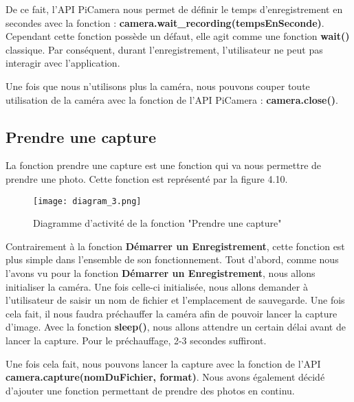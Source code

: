             De ce fait, l'API PiCamera nous permet de définir le temps d'enregistrement en secondes avec la fonction : \textbf{camera.wait\_recording(tempsEnSeconde)}. Cependant cette fonction possède un défaut, elle agit comme une fonction \textbf{wait()} classique. Par conséquent, durant l'enregistrement, l'utilisateur ne peut pas interagir avec l'application. 
            
            \vspace{0.4cm}

            Une fois que nous n'utilisons plus la caméra, nous pouvons couper toute utilisation de la caméra avec la fonction de l'API PiCamera : \textbf{camera.close()}.
            
        \subsection{Prendre une capture}
        La fonction prendre une capture est une fonction qui va nous permettre de prendre une photo.
        Cette fonction est représenté par la figure 4.10.
        \begin{figure}[ht]
            \centering
            \texttt{[image: diagram\_3.png]} 
            \caption{Diagramme d'activité de la fonction "Prendre une capture"}
        \end{figure}

        Contrairement à la fonction \textbf{Démarrer un Enregistrement}, cette fonction est plus simple dans l'ensemble de son fonctionnement. Tout d'abord, comme nous l'avons vu pour la fonction \textbf{Démarrer un Enregistrement}, nous allons initialiser la caméra. Une fois celle-ci initialisée, nous allons demander à l'utilisateur de saisir un nom de fichier et l'emplacement de sauvegarde. Une fois cela fait, il nous faudra préchauffer la caméra afin de pouvoir lancer la capture d'image. Avec la fonction \textbf{sleep()}, nous allons attendre un certain délai avant de lancer la capture.
        Pour le préchauffage, 2-3 secondes suffiront.

        \vspace{0.2cm}

        Une fois cela fait, nous pouvons lancer la capture avec la fonction de l'API \textbf{camera.capture(nomDuFichier, format)}. Nous avons également décidé d'ajouter une fonction permettant de prendre des photos en continu.

        \vspace{0.2cm}

